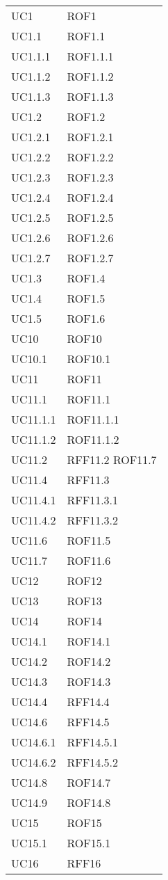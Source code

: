 \begin{longtable}{p{2.5cm}!{\VRule[1pt]}p{2.5cm}}
	UC1 & ROF1\\
	UC1.1 & ROF1.1\\
	UC1.1.1 & ROF1.1.1\\
	UC1.1.2 & ROF1.1.2\\
	UC1.1.3 & ROF1.1.3\\
	UC1.2 & ROF1.2\\
	UC1.2.1 & ROF1.2.1\\
	UC1.2.2 & ROF1.2.2\\
	UC1.2.3 & ROF1.2.3\\
	UC1.2.4 & ROF1.2.4\\
	UC1.2.5 & ROF1.2.5\\
	UC1.2.6 & ROF1.2.6\\
	UC1.2.7 & ROF1.2.7\\
	UC1.3 & ROF1.4\\
	UC1.4 & ROF1.5\\
	UC1.5 & ROF1.6\\
	UC10 & ROF10\\
	UC10.1 & ROF10.1\\
	UC11 & ROF11\\
	UC11.1 & ROF11.1\\
	UC11.1.1 & ROF11.1.1\\
	UC11.1.2 & ROF11.1.2\\
	UC11.2 & RFF11.2 \newline ROF11.7\\
	UC11.4 & RFF11.3\\
	UC11.4.1 & RFF11.3.1\\
	UC11.4.2 & RFF11.3.2\\
	UC11.6 & ROF11.5\\
	UC11.7 & ROF11.6\\
	UC12 & ROF12\\
	UC13 & ROF13\\
	UC14 & ROF14\\
	UC14.1 & ROF14.1\\
	UC14.2 & ROF14.2\\
	UC14.3 & ROF14.3\\
	UC14.4 & RFF14.4\\
	UC14.6 & RFF14.5\\
	UC14.6.1 & RFF14.5.1\\
	UC14.6.2 & RFF14.5.2\\
	UC14.8 & ROF14.7\\
	UC14.9 & ROF14.8\\
	UC15 & ROF15\\
	UC15.1 & ROF15.1\\
	UC16 & RFF16\\

\end{longtable}
